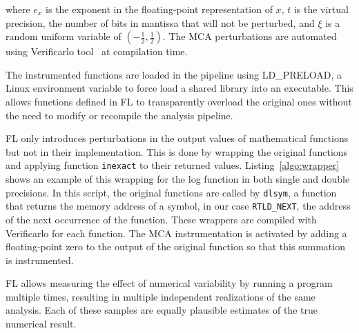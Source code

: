 \documentclass[conference]{IEEEtran}
\begin{document}
where $e_x$ is the exponent in the floating-point representation of $x$,
$t$ is the virtual precision, the number of bits in mantissa that will not be perturbed,
and $\xi$ is a random uniform variable of $(-\frac{1}{2}, \frac{1}{2})$.
The MCA perturbations are automated using Verificarlo tool~\cite{denis2015verificarlo} at compilation time.

The instrumented functions are loaded in the pipeline using LD\_PRELOAD, a Linux environment variable
to force load a shared library into an executable. This allows functions defined in FL to transparently
overload the original ones without the need to modify or recompile the analysis pipeline.

FL only introduces perturbations in the output values of mathematical
functions but not in their implementation. This is done by wrapping the original functions 
and applying function \texttt{inexact} to their returned values.
Listing~\ref{algo:wrapper} shows an example of this wrapping for the log function in both single and double precisions.
In this script, the original functions are called by \texttt{dlsym},
a function that returns the memory address of a symbol, in our case \texttt{RTLD\_NEXT}, the address of the next occurrence of the function.
These wrappers are compiled with Verificarlo for each function. The MCA
instrumentation is activated by adding a floating-point zero to the output
of the original function so that this summation is instrumented.




%

FL allows measuring the effect of numerical variability by running a program multiple times, 
resulting in multiple independent realizations of the same analysis. Each of these samples 
are equally plausible estimates of the true numerical result. 
\end{document}
